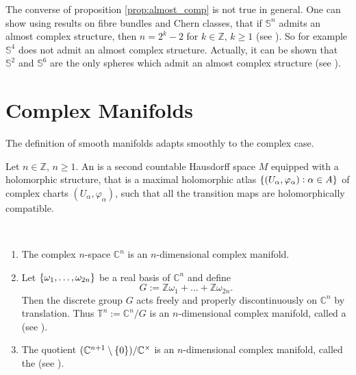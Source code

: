 \begin{remark}
The converse of proposition \ref{prop:almost_comp} is not true in general. One can show using results on fibre bundles and Chern classes, that if $\mathbb{S}^n$ admits an almost complex structure, then $n = 2^k - 2$ for $k \in \mathbb{Z}$, $k \geq 1$ (see \cite[219]{steenrod:topology_fibre:1951}). So for example $\mathbb{S}^4$ does not admit an almost complex structure. Actually, it can be shown that $\mathbb{S}^2$ and $\mathbb{S}^6$ are the only spheres which admit an almost complex structure (see \cite[434]{borel:steenrod:1953}).
\end{remark}

\section{Complex Manifolds}
The definition of smooth manifolds adapts smoothly to the complex case.

\begin{definition}
Let $n \in \mathbb{Z}$, $n \geq 1$. An  is a second countable Hausdorff space $M$ equipped with a holomorphic structure, that is a maximal holomorphic atlas $\cbr[0]{(U_\alpha, \varphi_\alpha) : \alpha \in A}$ of complex charts $(U_\alpha,\varphi_\alpha)$, such that all the transition maps are holomorphically compatible.
\end{definition}

\begin{examples}
~
\begin{enumerate}[label = \arabic*.]
\item The complex $n$-space $\mathbb{C}^n$ is an $n$-dimensional complex manifold. 
\item Let $\cbr[0]{\omega_1,\dots,\omega_{2n}}$ be a real basis of $\mathbb{C}^n$ and define
\begin{equation}
G := \mathbb{Z}\omega_1 + \dots + \mathbb{Z}\omega_{2n}.
\end{equation}
Then the discrete group $G$ acts freely and properly discontinuously on $\mathbb{C}^n$ by translation. Thus $\mathbb{T}^n := \mathbb{C}^n/G$ is an $n$-dimensional complex manifold, called a  (see \cite[206--207]{grauert:complex_manifolds:2010}). 
\item The quotient $(\mathbb{C}^{n + 1} \setminus \cbr[0]{0})/\mathbb{C}^\times$ is an $n$-dimensional complex manifold, called the  (see \cite[208--210]{grauert:complex_manifolds:2010}).
\end{enumerate}
\end{examples}

